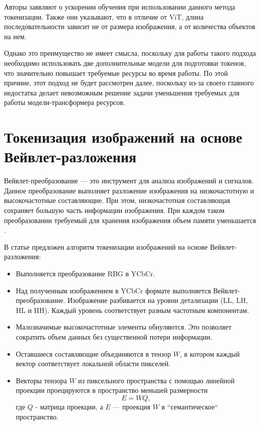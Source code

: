 \documentclass[times,specification,annotation]{itmo-student-thesis}
\begin{document}
Авторы заявляют о ускорении обучения при использовании данного метода токенизации. Также они указывают, что в отличие от ViT, длина последовательности зависит не от размера изображения, а от количества объектов на нем. 

Однако это преимущество не имеет смысла, поскольку для работы такого подхода необходимо использовать две дополнительные модели для подготовки токенов, что значительно повышает требуемые ресурсы во время работы. По этой причине, этот подход не будет рассмотрен далее, поскольку из-за своего главного недостатка делает невозможным решение задачи уменьшения требуемых для работы модели-трансформера ресурсов.

\section{Токенизация изображений на основе Вейвлет-разложения}

Вейвлет-преобразование --- это инструмент для анализа изображений и сигналов. Данное преобразование выполняет разложение изображения на низкочастотную и высокочастотные составляющие. При этом, низкочастотная составляющая сохраняет большую часть информации изображения. При каждом таком преобразовании требуемый для хранения изображения объем памяти уменьшается \cite{mallat_wavelet}.

В статье \cite{wavelet_tokenization} предложен алгоритм токенизации изображений на основе Вейвлет-разложения:

\begin{itemize}
    \item Выполняется преобразование RBG в YCbCr.
    \item Над полученным изображением в YCbCr формате выполняется Вейвлет-преобразование. Изображение разбивается на уровни детализации (LL, LH, HL и HH). Каждый уровень соответствует разным частотным компонентам.
    \item Малозначимые высокочастотные элементы обнуляются. Это позволяет сократить объем данных без существенной потери информации.
    \item Оставшиеся составляющие объединяются в тензор $W$, в котором каждый вектор соответствует локальной области пикселей.
    \item Векторы тензора $W$ из пиксельного пространства с помощью линейной проекции проецируются в пространство меньшей размерности 
    $$
    E = W Q,
    $$
    где $Q$ - матрица проекции, а $E$ --- проекция $W$ в ``семантическое`` пространство.
\end{itemize}
\end{document}
